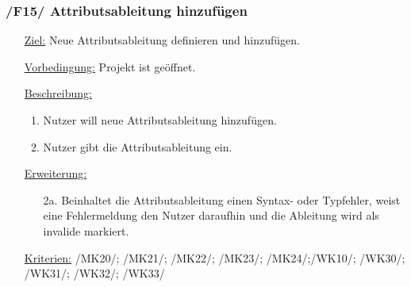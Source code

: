 \documentclass{article}
\begin{document}
\subsubsection*{\textbf{/F15/} Attributsableitung hinzufügen} \label{sec:f:Attributsableitung hinzufügen}
\begin{itemize}
    \item[\underline{Ziel:}] Neue Attributsableitung definieren und hinzufügen. 
    \item[\underline{Vorbedingung:}] Projekt ist geöffnet.
    \item[\underline{Beschreibung:}]
    \begin{enumerate}
        \item Nutzer will neue Attributsableitung hinzufügen.
        \item Nutzer gibt die Attributsableitung ein.
    \end{enumerate}
    \item[\underline{Erweiterung:}]
    \begin{itemize}
        \item[2a.] Beinhaltet die Attributsableitung einen Syntax- oder Typfehler, weist eine Fehlermeldung den Nutzer daraufhin und die Ableitung wird als invalide markiert. 
    \end{itemize}
    \item[\underline{Kriterien:}] /MK20/; /MK21/; /MK22/; /MK23/; /MK24/;\newline/WK10/; /WK30/; /WK31/; /WK32/; /WK33/
\end{itemize}
\end{document}
